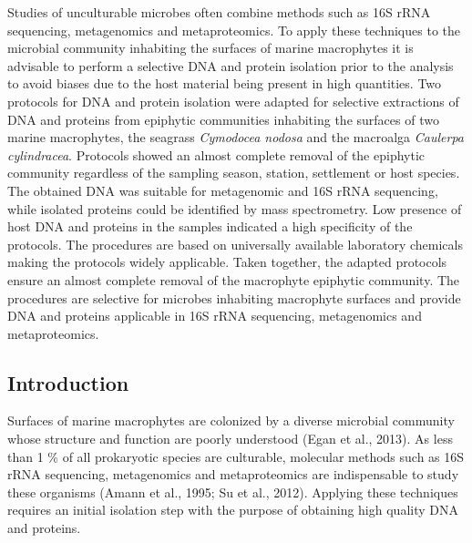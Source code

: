 \documentclass[12pt,]{article}
\begin{document}
Studies of unculturable microbes often combine methods such as 16S rRNA
sequencing, metagenomics and metaproteomics. To apply these techniques
to the microbial community inhabiting the surfaces of marine macrophytes
it is advisable to perform a selective DNA and protein isolation prior
to the analysis to avoid biases due to the host material being present
in high quantities. Two protocols for DNA and protein isolation were
adapted for selective extractions of DNA and proteins from epiphytic
communities inhabiting the surfaces of two marine macrophytes, the
seagrass \emph{Cymodocea nodosa} and the macroalga \emph{Caulerpa
cylindracea}. Protocols showed an almost complete removal of the
epiphytic community regardless of the sampling season, station,
settlement or host species. The obtained DNA was suitable for
metagenomic and 16S rRNA sequencing, while isolated proteins could be
identified by mass spectrometry. Low presence of host DNA and proteins
in the samples indicated a high specificity of the protocols. The
procedures are based on universally available laboratory chemicals
making the protocols widely applicable. Taken together, the adapted
protocols ensure an almost complete removal of the macrophyte epiphytic
community. The procedures are selective for microbes inhabiting
macrophyte surfaces and provide DNA and proteins applicable in 16S rRNA
sequencing, metagenomics and metaproteomics.

\newpage

\hypertarget{introduction}{%
\subsection{Introduction}\label{introduction}}

Surfaces of marine macrophytes are colonized by a diverse microbial
community whose structure and function are poorly understood (Egan et
al., 2013). As less than 1 \% of all prokaryotic species are culturable,
molecular methods such as 16S rRNA sequencing, metagenomics and
metaproteomics are indispensable to study these organisms (Amann et al.,
1995; Su et al., 2012). Applying these techniques requires an initial
isolation step with the purpose of obtaining high quality DNA and
proteins.
\end{document}
